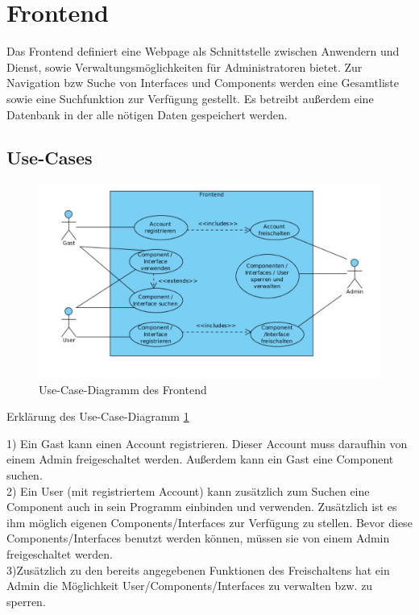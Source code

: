 \section{Frontend}
Das Frontend definiert eine Webpage als Schnittstelle zwischen Anwendern und Dienst, sowie Verwaltungsmöglichkeiten für Administratoren bietet. Zur Navigation bzw Suche von Interfaces und Components werden eine Gesamtliste sowie eine Suchfunktion zur Verfügung gestellt. Es betreibt außerdem eine Datenbank in der alle nötigen Daten gespeichert werden.

\subsection{Use-Cases}

\begin{figure}[!htp]
\begin{center}
\includegraphics[width=\textwidth]{bilder/use_case_frontend.pdf}
\caption{Use-Case-Diagramm des Frontend}
\label{fig:uc_front}
\end{center}
\end{figure}

Erklärung des Use-Case-Diagramm \ref{fig:uc_front}

1) Ein Gast kann einen Account registrieren. Dieser Account muss daraufhin von einem Admin freigeschaltet werden. Außerdem kann ein Gast eine Component suchen.\\
2) Ein User (mit registriertem Account) kann zusätzlich zum Suchen eine Component auch in sein Programm einbinden und verwenden. Zusätzlich ist es ihm möglich eigenen Components/Interfaces zur Verfügung zu stellen. Bevor diese Components/Interfaces benutzt werden können, müssen sie von einem Admin freigeschaltet werden.\\
3)Zusätzlich zu den bereits angegebenen Funktionen des Freischaltens hat ein Admin die Möglichkeit User/Components/Interfaces zu verwalten bzw. zu sperren.\\